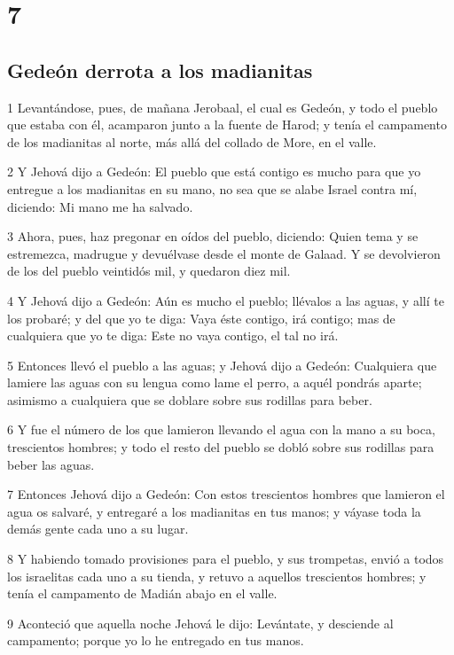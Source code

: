 \chapter{7}

\section*{Gedeón derrota a los madianitas}

\par 1 Levantándose, pues, de mañana Jerobaal, el cual es Gedeón, y todo el pueblo que estaba con él, acamparon junto a la fuente de Harod; y tenía el campamento de los madianitas al norte, más allá del collado de More, en el valle.
\par 2 Y Jehová dijo a Gedeón: El pueblo que está contigo es mucho para que yo entregue a los madianitas en su mano, no sea que se alabe Israel contra mí, diciendo: Mi mano me ha salvado.
\par 3 Ahora, pues, haz pregonar en oídos del pueblo, diciendo: Quien tema y se estremezca, madrugue y devuélvase desde el monte de Galaad. Y se devolvieron de los del pueblo veintidós mil, y quedaron diez mil.
\par 4 Y Jehová dijo a Gedeón: Aún es mucho el pueblo; llévalos a las aguas, y allí te los probaré; y del que yo te diga: Vaya éste contigo, irá contigo; mas de cualquiera que yo te diga: Este no vaya contigo, el tal no irá.
\par 5 Entonces llevó el pueblo a las aguas; y Jehová dijo a Gedeón: Cualquiera que lamiere las aguas con su lengua como lame el perro, a aquél pondrás aparte; asimismo a cualquiera que se doblare sobre sus rodillas para beber. 
\par 6 Y fue el número de los que lamieron llevando el agua con la mano a su boca, trescientos hombres; y todo el resto del pueblo se dobló sobre sus rodillas para beber las aguas.
\par 7 Entonces Jehová dijo a Gedeón: Con estos trescientos hombres que lamieron el agua os salvaré, y entregaré a los madianitas en tus manos; y váyase toda la demás gente cada uno a su lugar.
\par 8 Y habiendo tomado provisiones para el pueblo, y sus trompetas, envió a todos los israelitas cada uno a su tienda, y retuvo a aquellos trescientos hombres; y tenía el campamento de Madián abajo en el valle.
\par 9 Aconteció que aquella noche Jehová le dijo: Levántate, y desciende al campamento; porque yo lo he entregado en tus manos.
